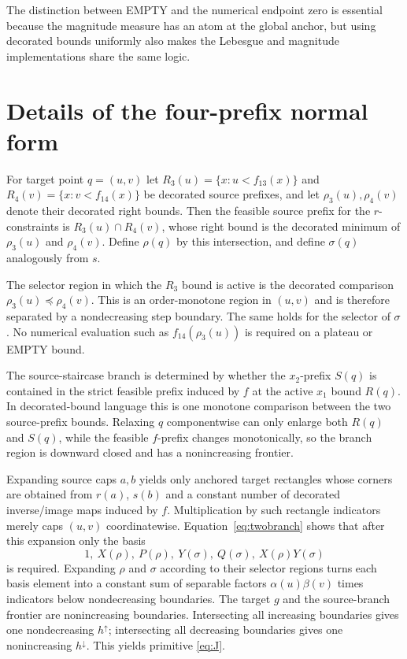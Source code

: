 \documentclass[12pt,a4paper]{article}
\theoremstyle{definition}
\newcommand{\1}{\mathbf 1}
\begin{document}
The distinction between EMPTY and the numerical endpoint zero is essential because the magnitude measure has an atom at the global anchor, but using decorated bounds uniformly also makes the Lebesgue and magnitude implementations share the same logic.

\section{Details of the four-prefix normal form}                   \label{app:prefix}

For target point $q=(u,v)$ let $R_3(u)=\{x:u<f_{13}(x)\}$ and $R_4(v)=\{x:v<f_{14}(x)\}$ be decorated source prefixes, and let $\rho_3(u),\rho_4(v)$ denote their decorated right bounds.  Then the feasible source prefix for the $r$-constraints is $R_3(u)\cap R_4(v)$, whose right bound is the decorated minimum of $\rho_3(u)$ and $\rho_4(v)$.  Define $\rho(q)$ by this intersection, and define $\sigma(q)$ analogously from $s$.

The selector region in which the $R_3$ bound is active is the decorated comparison $\rho_3(u)\preceq\rho_4(v)$.  This is an order-monotone region in $(u,v)$ and is therefore separated by a nondecreasing step boundary.  The same holds for the selector of $\sigma$.  No numerical evaluation such as $f_{14}(\rho_3(u))$ is required on a plateau or EMPTY bound.

The source-staircase branch is determined by whether the $x_2$-prefix $S(q)$ is contained in the strict feasible prefix induced by $f$ at the active $x_1$ bound $R(q)$.  In decorated-bound language this is one monotone comparison between the two source-prefix bounds.  Relaxing $q$ componentwise can only enlarge both $R(q)$ and $S(q)$, while the feasible $f$-prefix changes monotonically, so the branch region is downward closed and has a nonincreasing frontier.

Expanding source caps $a,b$ yields only anchored target rectangles whose corners are obtained from $r(a)$, $s(b)$ and a constant number of decorated inverse/image maps induced by $f$.  Multiplication by such rectangle indicators merely caps $(u,v)$ coordinatewise. Equation~\eqref{eq:twobranch} shows that after this expansion only the basis
\[
1,\ X(\rho),\ P(\rho),\ Y(\sigma),\ Q(\sigma),\ X(\rho)Y(\sigma)
\]
is required. Expanding $\rho$ and $\sigma$ according to their selector regions turns each basis element into a constant sum of separable factors $\alpha(u)\beta(v)$ times indicators below nondecreasing boundaries. The target $g$ and the source-branch frontier are nonincreasing boundaries. Intersecting all increasing boundaries gives one nondecreasing $h^\uparrow$; intersecting all decreasing boundaries gives one nonincreasing $h^\downarrow$. This yields primitive \eqref{eq:J}.
\end{document}
